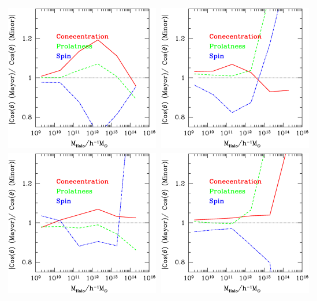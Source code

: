 \documentclass[usenatbib]{mn2e}
\begin{document}



\begin{figure}
\includegraphics[width=0.35\textwidth]{../tmp/Type/T_Web_256.ps}
\includegraphics[width=0.35\textwidth]{../tmp/Type/V_Web_256.ps}
\includegraphics[width=0.35\textwidth]{../tmp/Type/JT_Web_256.ps}
\includegraphics[width=0.35\textwidth]{../tmp/Type/JV_Web_256.ps}

\end{figure}
\end{document}

